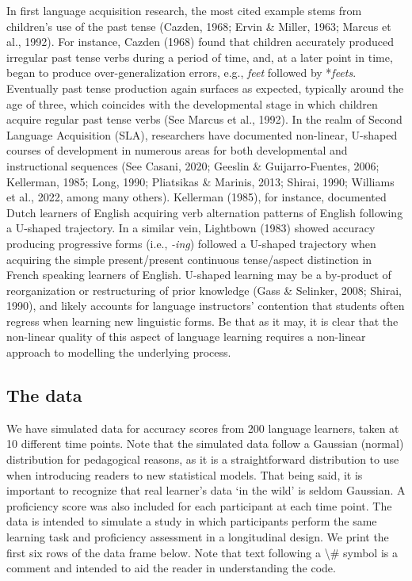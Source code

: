 \documentclass[
  letterpaper,
  DIV=11,
  numbers=noendperiod]{scrartcl}
\begin{document}
In first language acquisition research, the most cited example stems
from children's use of the past tense (Cazden, 1968; Ervin \& Miller,
1963; Marcus et al., 1992). For instance, Cazden (1968) found that
children accurately produced irregular past tense verbs during a period
of time, and, at a later point in time, began to produce
over-generalization errors, e.g., \emph{feet} followed by *\emph{feets}.
Eventually past tense production again surfaces as expected, typically
around the age of three, which coincides with the developmental stage in
which children acquire regular past tense verbs (See Marcus et al.,
1992). In the realm of Second Language Acquisition (SLA), researchers
have documented non-linear, U-shaped courses of development in numerous
areas for both developmental and instructional sequences (See Casani,
2020; Geeslin \& Guijarro-Fuentes, 2006; Kellerman, 1985; Long, 1990;
Pliatsikas \& Marinis, 2013; Shirai, 1990; Williams et al., 2022, among
many others). Kellerman (1985), for instance, documented Dutch learners
of English acquiring verb alternation patterns of English following a
U-shaped trajectory. In a similar vein, Lightbown (1983) showed accuracy
producing progressive forms (i.e., \emph{-ing}) followed a U-shaped
trajectory when acquiring the simple present/present continuous
tense/aspect distinction in French speaking learners of English.
U-shaped learning may be a by-product of reorganization or restructuring
of prior knowledge (Gass \& Selinker, 2008; Shirai, 1990), and likely
accounts for language instructors' contention that students often
regress when learning new linguistic forms. Be that as it may, it is
clear that the non-linear quality of this aspect of language learning
requires a non-linear approach to modelling the underlying process.

\subsection{The data}\label{the-data}

We have simulated data for accuracy scores from 200 language learners,
taken at 10 different time points. Note that the simulated data follow a
Gaussian (normal) distribution for pedagogical reasons, as it is a
straightforward distribution to use when introducing readers to new
statistical models. That being said, it is important to recognize that
real learner's data `in the wild' is seldom Gaussian. A proficiency
score was also included for each participant at each time point. The
data is intended to simulate a study in which participants perform the
same learning task and proficiency assessment in a longitudinal design.
We print the first six rows of the data frame below. Note that text
following a \textbackslash\# symbol is a comment and intended to aid the
reader in understanding the code.
\end{document}
